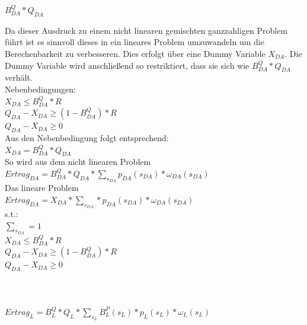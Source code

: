 \documentclass{article}
\begin{document}
    $B^Q_{DA} * Q_{DA}$ 

Da dieser Ausdruck zu einem nicht linearen gemischten ganzzahligen Problem führt ist es sinnvoll dieses in ein lineares Problem umzuwandeln  um die Berechenbarkeit zu verbesseren.
Dies erfolgt über eine Dummy Variable $X_{DA}$. Die Dummy Variable wird anschließend so restriktiert, dass sie sich wie $B^Q_{DA} * Q_{DA}$ verhält.
\\
Nebenbedingungen:\\
$X_{DA} \leq B^Q_{DA} * R$\\
$Q_{DA} - X_{DA} \geq (1 - B^Q_{DA}) * R$\\
$Q_{DA} - X_{DA} \geq 0 $\\
Aus den Nebenbedingung folgt entsprechend:\\
$X_{DA} = B^Q_{DA} * Q_{DA}$\\

So wird aus dem nicht linearen Problem\\
$Ertrag_{DA} = B^Q_{DA} * Q_{DA} * \sum_{s_{DA}}  p_{DA}(s_{DA}) * \omega_{DA}(s_{DA})  $\\
Das lineare Problem\\
$Ertrag_{DA} = X_{DA} * \sum_{s_{DA}} * p_{DA}(s_{DA}) * \omega_{DA}(s_{DA})  $\\
s.t.:\\
$\sum_{s_{DA}} = 1$\\
$X_{DA} \leq B^Q_{DA} * R$\\
$Q_{DA} - X_{DA} \geq (1 - B^Q_{DA}) * R$\\
$Q_{DA} - X_{DA} \geq 0 $\\

\\
\\
\\
$Ertrag_{L} = B^Q_{L} * Q_{L} * \sum_{s_{L}} B^P_{L}(s_{L}) * p_{L}(s_{L}) * \omega_{L}(s_{L})  $\\
\end{document}
